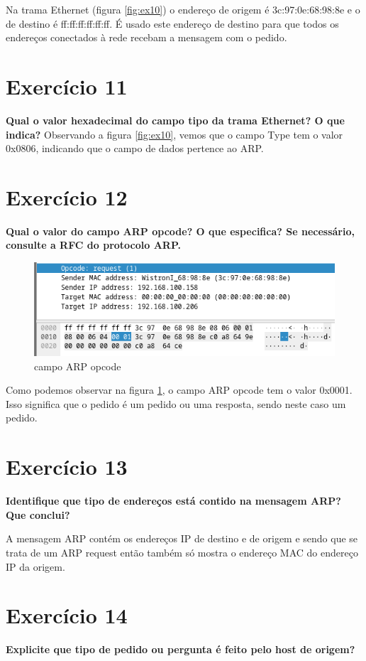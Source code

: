 \documentclass[a4paper]{report}
\begin{document}
Na trama Ethernet (figura \ref{fig:ex10}) o endereço de origem é 3c:97:0e:68:98:8e
e o de destino é ff:ff:ff:ff:ff:ff. É usado este endereço de destino para que todos
os endereços conectados à rede recebam a mensagem com o pedido.

\section{Exercício 11}
\textbf{Qual o valor hexadecimal do campo tipo da trama Ethernet? O que indica?}
Observando a figura \ref{fig:ex10}, vemos que o campo Type tem o valor 0x0806, 
indicando que o campo de dados pertence ao ARP.

\section{Exercício 12}
\textbf{Qual o valor do campo ARP opcode? O que especifica?  Se necessário,
consulte a RFC do protocolo ARP.}

\begin{figure}[H]
    \centering 
    \includegraphics[width=\textwidth]{images/ex12.png}
    \caption{campo ARP opcode}
    \label{fig:ex12}
\end{figure}

Como podemos observar na figura \ref{fig:ex12}, o campo ARP opcode tem o valor 0x0001.
Isso significa que o pedido é um pedido ou uma resposta, sendo neste caso um pedido.

\section{Exercício 13}
\textbf{Identifique que tipo de endereços está contido na mensagem ARP? Que
conclui?}

A mensagem ARP contém os endereços IP de destino e de origem e sendo que se trata
de um ARP request então também só mostra o endereço MAC do endereço IP da origem.

\section{Exercício 14}
\textbf{Explicite que tipo de pedido ou pergunta é feito pelo host de origem?}
\end{document}
